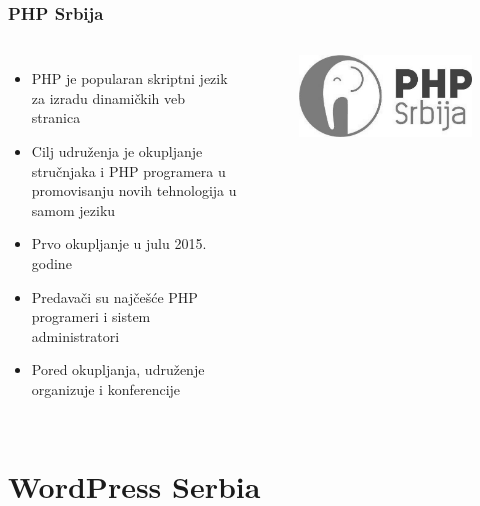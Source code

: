 \documentclass[hyperref={bookmarks=false},aspectratio=169]{beamer}
\begin{document}
\begin{frame}
\frametitle{PHP Srbija}

\begin{columns}[T]

\begin{itemize}
    \item PHP je popularan skriptni jezik za izradu dinamičkih veb stranica 
    \item Cilj udruženja je okupljanje stručnjaka i PHP programera u promovisanju novih tehnologija u samom jeziku
    \item Prvo okupljanje u julu 2015. godine
    \item Predavači su najčešće PHP programeri i sistem administratori
    \item Pored okupljanja, udruženje organizuje i konferencije
\end{itemize}

\begin{figure}
    \raggedleft
    \includegraphics[scale=0.15]{./images/php_gray.jpg}
\end{figure}

\end{columns}

\end{frame}

\section{WordPress Serbia}
\end{document}
